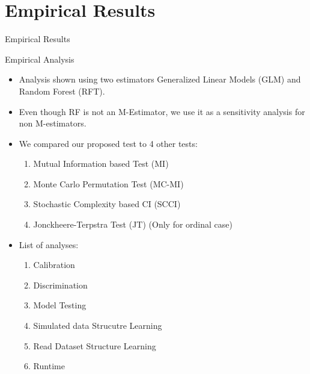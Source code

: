 \documentclass{beamer}
\begin{document}
\section{Empirical Results}
\begin{frame}
	\begin{center} \Huge{Empirical Results} \end{center}
\end{frame}
\begin{frame}{Empirical Analysis}
	\begin{itemize}
		\item Analysis shown using two estimators Generalized Linear Models (GLM) and Random Forest (RFT).
		\item Even though RF is not an M-Estimator, we use it as a sensitivity analysis for non M-estimators.
		\item We compared our proposed test to 4 other tests:
			\begin{enumerate}
				\item Mutual Information based Test (MI)
				\item Monte Carlo Permutation Test (MC-MI)
				\item Stochastic Complexity based CI (SCCI)
				\item Jonckheere-Terpstra Test (JT) (Only for ordinal case)
			\end{enumerate}
		\item List of analyses:
			\begin{enumerate}
				\item Calibration
				\item Discrimination
				\item Model Testing
				\item Simulated data Strucutre Learning
				\item Read Dataset Structure Learning
				\item Runtime
			\end{enumerate}

	\end{itemize}
\end{frame}
\end{document}
